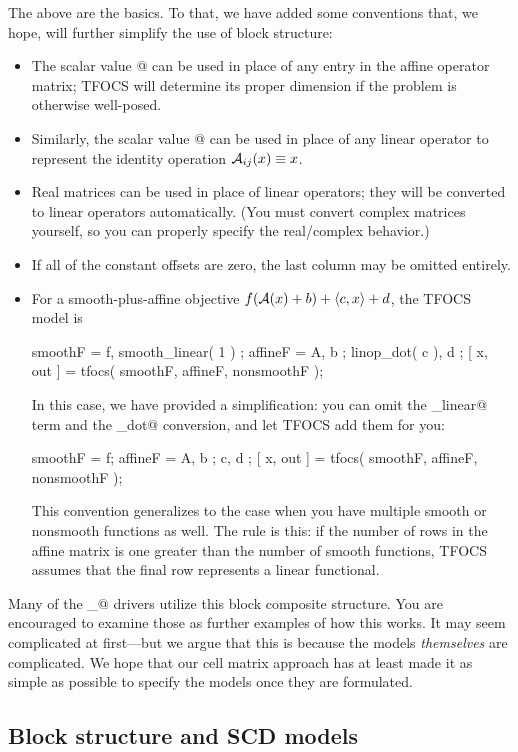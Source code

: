 \documentclass{article}
\begin{document}
The above are the basics. To that, we have added some conventions that,
we hope, will further simplify the use of block structure:
\begin{itemize}
\item The scalar value @ can be used in place of any entry in
the affine operator matrix; TFOCS will determine its proper dimension
if the problem is otherwise well-posed.
\item Similarly, the scalar value @ can be used in place of
any linear operator to represent the identity operation $\mathcal{A}_{ij}(x)\equiv x$.
\item Real matrices can be used in place of linear operators; they will
be converted to linear operators automatically. (You must convert complex
matrices yourself, so you can properly specify the real/complex behavior.)
\item If all of the constant offsets are zero, the last column may be omitted entirely.
\item For a smooth-plus-affine objective
$f(\mathcal{A}(x)+b)+\langle c,x\rangle+d$, the TFOCS model is
\begin{code}
	smoothF = { f, smooth_linear( 1 ) };
	affineF = { A, b ; linop_dot( c ), d };
	[ x, out ] = tfocs( smoothF, affineF, nonsmoothF );
\end{code}
In this case, we have provided a simplification: you can omit the
\verb@smooth_linear@ term and the \verb@linop_dot@ conversion, and let
TFOCS add them for you:
\begin{code}
	smoothF = f;
	affineF = { A, b ; c, d };
	[ x, out ] = tfocs( smoothF, affineF, nonsmoothF );
\end{code}
This convention generalizes to the case when you have multiple 
smooth or nonsmooth functions as well.
The rule is this: if the number of rows in the affine matrix is
one greater than the number of smooth functions,
TFOCS assumes that the final row represents a linear functional.
\end{itemize}

Many of the \verb@solver_@ drivers utilize this block composite
structure. You are encouraged to examine those as further examples
of how this works. It may seem complicated at first---but we argue
that this is because the models \emph{themselves} are complicated.
We hope that our cell matrix approach has at least made it as simple
as possible to specify the models once they are formulated.

\subsection{Block structure and SCD models}
\label{sec:SCD}
\end{document}
